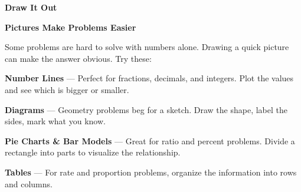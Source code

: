 \clearpage
\thispagestyle{empty}
{\sffamily

\begin{center}
{\fontsize{22}{26}\selectfont\bfseries\color{funPink} \faPalette\hspace{3mm}Draw It Out\hspace{3mm}\faPalette}

\vspace{2mm}
{\color{funGray}\hrulefill}
\end{center}

\vspace{3mm}

\begin{tcolorbox}[
    enhanced,
    colback=funPinkLight,
    colframe=funPink!50,
    arc=10pt,
    boxrule=1.5pt,
    left=6mm, right=6mm, top=5mm, bottom=5mm,
]
{\large\bfseries\color{funPinkDark} \faDrawPolygon\hspace{2mm}Pictures Make Problems Easier}

\vspace{2mm}

Some problems are hard to solve with numbers alone. Drawing a quick picture can make the answer obvious. Try these:

\vspace{3mm}

\textcolor{funPink}{\faRulerHorizontal}\hspace{2mm}\textbf{Number Lines} — Perfect for fractions, decimals, and integers. Plot the values and see which is bigger or smaller.

\vspace{2mm}

\textcolor{funPink}{\faShapes}\hspace{2mm}\textbf{Diagrams} — Geometry problems beg for a sketch. Draw the shape, label the sides, mark what you know.

\vspace{2mm}

\textcolor{funPink}{\faChartPie}\hspace{2mm}\textbf{Pie Charts \& Bar Models} — Great for ratio and percent problems. Divide a rectangle into parts to visualize the relationship.

\vspace{2mm}

\textcolor{funPink}{\faTable}\hspace{2mm}\textbf{Tables} — For rate and proportion problems, organize the information into rows and columns.
\end{tcolorbox}

}
